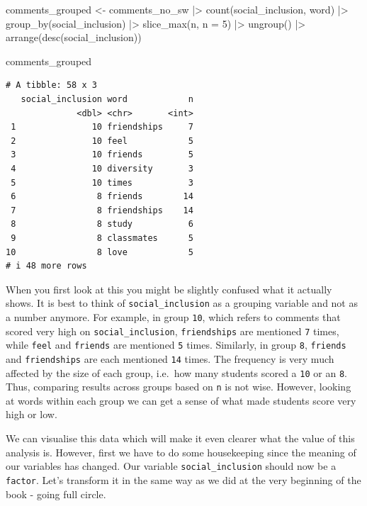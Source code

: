 \documentclass[
  letterpaper,
]{krantz}
\makeatletter
\newenvironment{Shaded}{\begin{snugshade}}{\end{snugshade}}
\newcommand{\AttributeTok}[1]{\textcolor[rgb]{0.40,0.45,0.13}{#1}}
\newcommand{\DecValTok}[1]{\textcolor[rgb]{0.68,0.00,0.00}{#1}}
\newcommand{\FunctionTok}[1]{\textcolor[rgb]{0.28,0.35,0.67}{#1}}
\newcommand{\NormalTok}[1]{\textcolor[rgb]{0.00,0.23,0.31}{#1}}
\newcommand{\OtherTok}[1]{\textcolor[rgb]{0.00,0.23,0.31}{#1}}
\newcommand{\SpecialCharTok}[1]{\textcolor[rgb]{0.37,0.37,0.37}{#1}}
\newenvironment{kframe}{%
\medskip{}
\setlength{\fboxsep}{.8em}
 \def\at@end@of@kframe{}%
 \ifinner\ifhmode%
  \def\at@end@of@kframe{\end{minipage}}%
  \begin{minipage}{\columnwidth}%
 \fi\fi%
 \def\FrameCommand##1{\hskip\@totalleftmargin \hskip-\fboxsep
 \colorbox{shadecolor}{##1}\hskip-\fboxsep
     \hskip-\linewidth \hskip-\@totalleftmargin \hskip\columnwidth}%
 \MakeFramed {\advance\hsize-\width
   \@totalleftmargin\z@ \linewidth\hsize
   \@setminipage}}%
 {\par\unskip\endMakeFramed%
 \at@end@of@kframe}
\renewenvironment{Shaded}{\begin{kframe}}{\end{kframe}}
\makeatother
\begin{document}
\begin{Shaded}
\begin{Highlighting}[]
\NormalTok{comments\_grouped }\OtherTok{\textless{}{-}}
\NormalTok{  comments\_no\_sw }\SpecialCharTok{|\textgreater{}}
  \FunctionTok{count}\NormalTok{(social\_inclusion, word) }\SpecialCharTok{|\textgreater{}}
  \FunctionTok{group\_by}\NormalTok{(social\_inclusion) }\SpecialCharTok{|\textgreater{}}
  \FunctionTok{slice\_max}\NormalTok{(n, }\AttributeTok{n =} \DecValTok{5}\NormalTok{) }\SpecialCharTok{|\textgreater{}}
  \FunctionTok{ungroup}\NormalTok{() }\SpecialCharTok{|\textgreater{}}
  \FunctionTok{arrange}\NormalTok{(}\FunctionTok{desc}\NormalTok{(social\_inclusion))}

\NormalTok{comments\_grouped}
\end{Highlighting}
\end{Shaded}

\begin{verbatim}
# A tibble: 58 x 3
   social_inclusion word            n
              <dbl> <chr>       <int>
 1               10 friendships     7
 2               10 feel            5
 3               10 friends         5
 4               10 diversity       3
 5               10 times           3
 6                8 friends        14
 7                8 friendships    14
 8                8 study           6
 9                8 classmates      5
10                8 love            5
# i 48 more rows
\end{verbatim}

When you first look at this you might be slightly confused what it
actually shows. It is best to think of \texttt{social\_inclusion} as a
grouping variable and not as a number anymore. For example, in group
\texttt{10}, which refers to comments that scored very high on
\texttt{social\_inclusion}, \texttt{friendships} are mentioned
\texttt{7} times, while \texttt{feel} and \texttt{friends} are mentioned
\texttt{5} times. Similarly, in group \texttt{8}, \texttt{friends} and
\texttt{friendships} are each mentioned \texttt{14} times. The frequency
is very much affected by the size of each group, i.e.~how many students
scored a \texttt{10} or an \texttt{8}. Thus, comparing results across
groups based on \texttt{n} is not wise. However, looking at words within
each group we can get a sense of what made students score very high or
low.

We can visualise this data which will make it even clearer what the
value of this analysis is. However, first we have to do some
housekeeping since the meaning of our variables has changed. Our
variable \texttt{social\_inclusion} should now be a \texttt{factor}.
Let's transform it in the same way as we did at the very beginning of
the book - going full circle.
\end{document}
